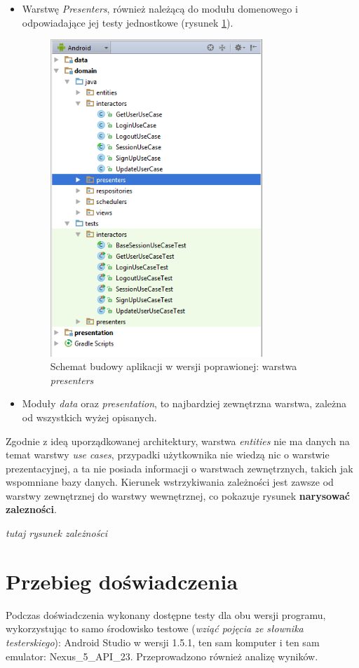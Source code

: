 \begin{itemize}
\item
Warstwę \textit{Presenters}, również należącą do modułu domenowego i odpowiadające jej testy jednostkowe (rysunek \ref{fig:app_cl_presenters}).
\begin{figure}[!htb]
    \centering
    \includegraphics[width=8cm]{imgs/ch6_app_cl_presenters.png}
    \caption
{Schemat budowy aplikacji w wersji poprawionej: warstwa \textit{presenters}}
    \label{fig:app_cl_presenters}
\end{figure} 

\item
Moduły \textit{data} oraz \textit{presentation}, to najbardziej zewnętrzna warstwa, zależna od wszystkich wyżej opisanych. 
\end{itemize}

Zgodnie z ideą uporządkowanej architektury, warstwa \textit{entities} nie ma danych na temat warstwy \textit{use cases}, przypadki użytkownika nie wiedzą nic o warstwie prezentacyjnej, a ta nie posiada informacji o warstwach zewnętrznych, takich jak wspomniane bazy danych. Kierunek wstrzykiwania zależności jest zawsze od warstwy zewnętrznej do warstwy wewnętrznej, co pokazuje rysunek \textbf{narysować zalezności}.

\textit{tutaj rysunek zależności}

\section{Przebieg doświadczenia}
Podczas doświadczenia wykonany dostępne testy dla obu wersji programu, wykorzystując to samo środowisko testowe (\textit{wziąć pojęcia ze słownika testerskiego}): Android Studio w wersji 1.5.1, ten sam komputer i ten sam emulator: Nexus\_5\_API\_23. Przeprowadzono również analizę wyników.

